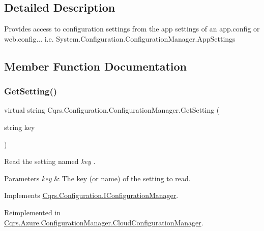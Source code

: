 \subsection{Detailed Description}
Provides access to configuration settings from the app settings of an app.\+config or web.\+config... i.\+e. System.\+Configuration.\+Configuration\+Manager.\+App\+Settings 



\subsection{Member Function Documentation}
\mbox{\label{classCqrs_1_1Configuration_1_1ConfigurationManager_ac3e31af665b95b781fee23f577170a63_ac3e31af665b95b781fee23f577170a63}} 
\subsubsection{\texorpdfstring{Get\+Setting()}{GetSetting()}}
{\footnotesize\ttfamily virtual string Cqrs.\+Configuration.\+Configuration\+Manager.\+Get\+Setting (\begin{DoxyParamCaption}\item[{string}]{key }\end{DoxyParamCaption})\hspace{0.3cm}{\ttfamily [virtual]}}



Read the setting named {\itshape key} . 


\begin{DoxyParams}{Parameters}
{\em key} & The key (or name) of the setting to read.\\
\hline
\end{DoxyParams}


Implements \hyperlink{interfaceCqrs_1_1Configuration_1_1IConfigurationManager_a9f7b7d4d8c26a0589f01c8a7f69901ef_a9f7b7d4d8c26a0589f01c8a7f69901ef}{Cqrs.\+Configuration.\+I\+Configuration\+Manager}.



Reimplemented in \hyperlink{classCqrs_1_1Azure_1_1ConfigurationManager_1_1CloudConfigurationManager_a48228b7e2204a2449426de32cd6ecc65_a48228b7e2204a2449426de32cd6ecc65}{Cqrs.\+Azure.\+Configuration\+Manager.\+Cloud\+Configuration\+Manager}.

